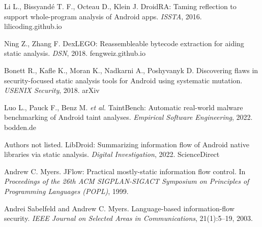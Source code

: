 \documentclass[a4paper,12pt]{report}
\begin{document}
\begin{thebibliography}{99}
    Li L., Bissyandé T. F., Octeau D., Klein J. DroidRA: Taming reflection to support whole-program analysis of Android apps. \textit{ISSTA}, 2016. lilicoding.github.io

    Ning Z., Zhang F. DexLEGO: Reassembleable bytecode extraction for aiding static analysis. \textit{DSN}, 2018. fengweiz.github.io

    Bonett R., Kafle K., Moran K., Nadkarni A., Poshyvanyk D. Discovering flaws in security-focused static analysis tools for Android using systematic mutation. \textit{USENIX Security}, 2018. arXiv

    Luo L., Pauck F., Benz M. \emph{et al.} TaintBench: Automatic real-world malware benchmarking of Android taint analyses. \textit{Empirical Software Engineering}, 2022. bodden.de

    Authors not listed. LibDroid: Summarizing information flow of Android native libraries via static analysis. \textit{Digital Investigation}, 2022. ScienceDirect

Andrew C. Myers.
\newblock JFlow: Practical mostly-static information flow control.
\newblock In \emph{Proceedings of the 26th ACM SIGPLAN-SIGACT Symposium on Principles of Programming Languages (POPL)}, 1999.

Andrei Sabelfeld and Andrew C. Myers.
\newblock Language-based information-flow security.
\newblock \emph{IEEE Journal on Selected Areas in Communications}, 21(1):5–19, 2003.


\end{thebibliography}
\end{document}
